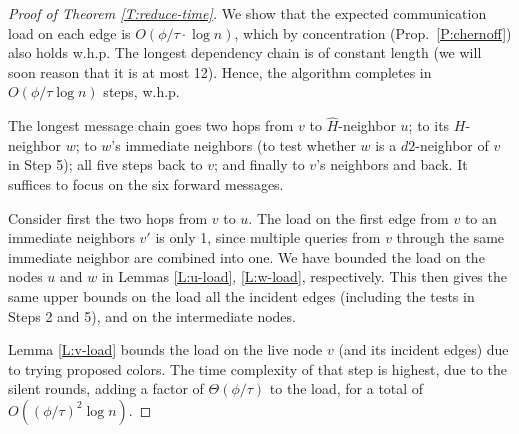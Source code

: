 \begin{proof}[Proof of Theorem \ref{T:reduce-time}]
We show that the expected communication load on each edge is $O(\phi/\tau \cdot \log n)$, 
which by concentration (Prop.~\ref{P:chernoff}) also holds w.h.p. 
The longest dependency chain is of constant length (we will soon reason that it is at most 12).
Hence, the algorithm completes in $O(\phi/\tau \log n)$ steps, w.h.p.

The longest message chain goes two hops from $v$ to $\hat{H}$-neighbor $u$;
to its $H$-neighbor $w$; to $w$'s immediate neighbors (to test whether $w$ is a $d2$-neighbor of $v$ in Step 5); all five steps back to $v$; and finally to $v$'s neighbors and back.
It suffices to focus on the six forward messages. 


Consider first the two hops from $v$ to $u$.
The load on the first edge from $v$ to an immediate neighbors $v'$ is only 1, since multiple queries from $v$ through the same immediate neighbor are combined into one. 
We have bounded the load on the nodes $u$ and $w$ in Lemmas \ref{L:u-load}, \ref{L:w-load}, respectively. This then gives the same upper bounds on the load all the incident edges (including the tests in Steps 2 and 5), and on the intermediate nodes.

Lemma \ref{L:v-load} bounds the load on the live node $v$ (and its incident edges) due to trying proposed colors.
The time complexity of that step is highest, due to the silent rounds, adding a factor of $\Theta(\phi/\tau)$ to the load, for a total of $O((\phi/\tau)^2 \log n)$. 


\end{proof}
